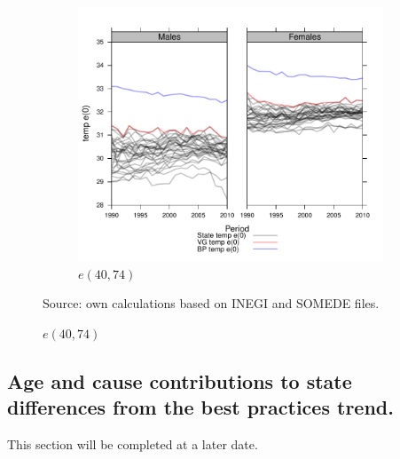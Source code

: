 \documentclass{article}
\begin{document}
\begin{figure}
\begin{subfigure}{\textwidth}
\end{subfigure}
\\
\begin{subfigure}{\textwidth}
\centering
\caption{$e(40,74)$}
\vspace{-2em}
\label{fig:e40_74}
\includegraphics[scale=.5]{Figures/et40_74.pdf}
\end{subfigure}
Source: own calculations based on INEGI and SOMEDE files. 
\end{figure}

\FloatBarrier

\subsection*{Age and cause contributions to state differences from the best
practices trend.}
This section will be completed at a later date.

\end{document}
